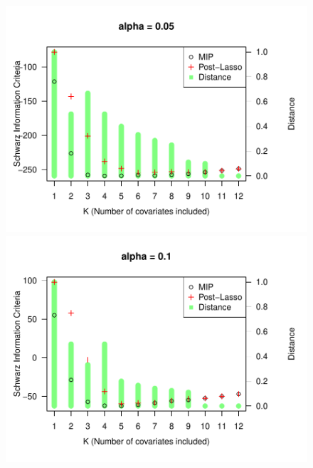 \begin{figure}
  \centering
  \begin{minipage}[t]{0.4\linewidth}
    \centering
    \begin{minipage}[t]{\linewidth}
      \centering     \includegraphics[width=\textwidth]{Figuras/SIC005.pdf}
    \end{minipage}
    \begin{minipage}[b]{\linewidth}
      \centering     \includegraphics[width=\textwidth]{Figuras/SIC01.pdf}
    \end{minipage}
     \begin{minipage}[b]{\linewidth}

\end{minipage}
\end{minipage}
\end{figure}
